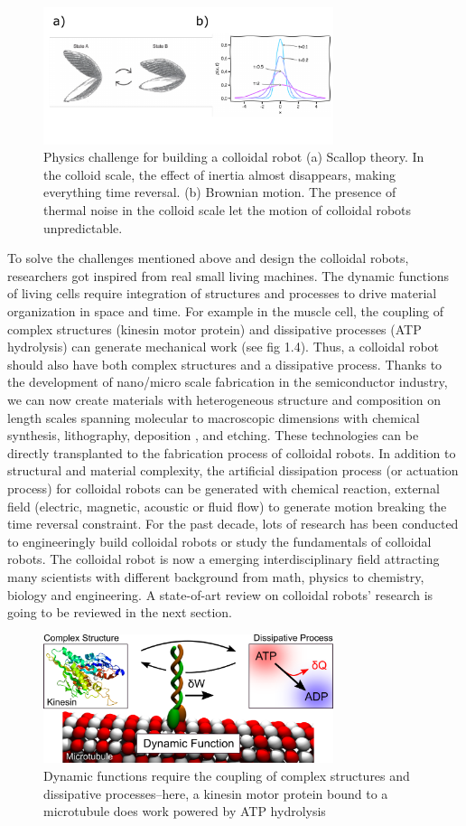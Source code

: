 \begin{figure}
\centering
\includegraphics[width=8.5cm]{figures/1_3.pdf}
\caption{Physics challenge for building a colloidal robot (a) Scallop theory. In the colloid scale, the effect of inertia almost disappears, making everything time reversal. (b) Brownian motion. The presence of thermal noise in the colloid scale let the motion of colloidal robots unpredictable.}
\label{fig:1.3}
\end{figure}
To solve the  challenges mentioned above and design the colloidal robots, researchers got inspired from real small living  machines. The dynamic functions of living cells require integration of structures and processes to drive material organization in space and time. For example in the muscle cell,  the coupling of complex structures (kinesin motor protein) and dissipative processes (ATP hydrolysis) can generate mechanical work (see fig 1.4). Thus, a colloidal robot should also have both complex structures and a dissipative process. Thanks to the development of nano/micro scale fabrication in the semiconductor industry, we can now create materials with heterogeneous structure and composition on length scales spanning molecular to macroscopic dimensions with chemical synthesis, lithography, deposition , and etching. These technologies can be directly transplanted to the fabrication process of colloidal robots. In addition to structural and material complexity, the artificial dissipation process (or actuation process) for colloidal robots  can be generated  with chemical reaction, external field (electric, magnetic, acoustic or fluid flow) to generate motion breaking the time reversal constraint. For the past decade, lots of research has been conducted to engineeringly build colloidal robots  or study the fundamentals of colloidal robots. The colloidal robot is now a emerging interdisciplinary field attracting many scientists with different background from math, physics to chemistry, biology and engineering. A state-of-art  review on colloidal robots' research is going to be reviewed in the next section.
\begin{figure}
\centering
\includegraphics[width=8.5cm]{figures/1_4.png}
\caption{Dynamic functions require the coupling of complex structures and dissipative processes–here, a kinesin motor protein bound to a microtubule  does work powered by ATP hydrolysis}
\label{fig:1.4}
\end{figure}


